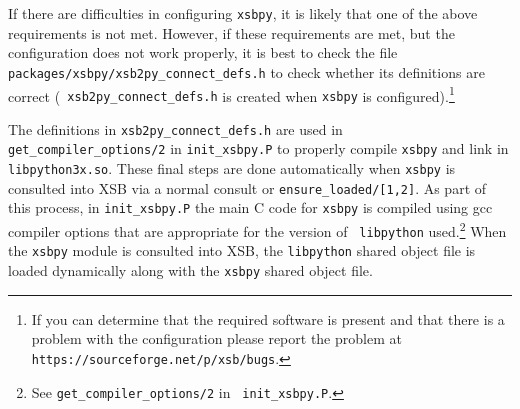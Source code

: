 %
%
%
%
%

If there are difficulties in configuring {\tt xsbpy}, it is likely
that one of the above requirements is not met.  However, if these
requirements are met, but the configuration does not work properly, it
is best to check the file {\tt packages/xsbpy/xsb2py\_connect\_defs.h}
to check whether its definitions are correct ({\tt
  xsb2py\_connect\_defs.h} is created when {\tt xsbpy} is
configured).\footnote{If you can determine that the required software
  is present and that there is a problem with the configuration please
  report the problem at {\tt https://sourceforge.net/p/xsb/bugs}.}

The definitions in {\tt xsb2py\_connect\_defs.h} are used in {\tt
  get\_compiler\_options/2} in {\tt init\_xsbpy.P} to properly compile
{\tt xsbpy} and link in {\tt libpython3x.so}.  These final steps are
done automatically when {\tt xsbpy} is consulted into XSB via a normal
consult or {\tt ensure\_loaded/[1,2]}.  As part of this process, in
{\tt init\_xsbpy.P} the main C code for {\tt xsbpy} is compiled using
gcc compiler options that are appropriate for the version of {\tt
  libpython} used.\footnote{See {\tt get\_compiler\_options/2} in {\tt
    init\_xsbpy.P}.}  When the {\tt xsbpy} module is consulted into
XSB, the {\tt libpython} shared object file is loaded dynamically
along with the {\tt xsbpy} shared object file.

%
%

